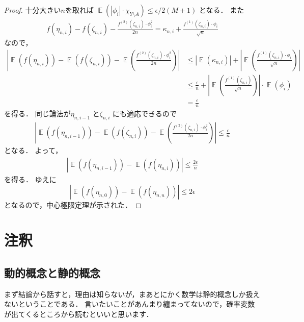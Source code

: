 \documentclass[leqno, 12pt]{jsarticle}
\DeclareMathOperator{\mean}{\mathbb{E}}
\begin{document}
\begin{proof}
十分大きい$n$を取れば
$\mean(|\phi_{i}|\cdot \chi_{Y\setminus A})\le\epsilon/2(M+1)$
となる．
また
\begin{align*}
f(\eta_{n, i})-f(\zeta_{n, i})-\frac{f^{(2)}(\zeta_{n, i})\cdot \phi_{i}^2}{2n}
=
\kappa_{n, i}+
\frac{f^{(1)}(\zeta_{n, i})\cdot \phi_{i}}{\sqrt{n}}
\end{align*}
なので，
\begin{align*}
\left|
\mean\left(
f(\eta_{n, i})\right)
-
\mean(f(\zeta_{n, i}))
-
\mean\left(\frac{f^{(2)}(\zeta_{n, i})\cdot \phi_{i}^2}{2n}
\right)
\right|
&\le 
|\mean(\kappa_{n, i})|
+
\left|
\mean\left(
\frac{f^{(1)}(\zeta_{n, i})\cdot \phi_{i}}{\sqrt{n}}
\right)
\right|
\\
&\le 
\frac{\epsilon}{n}
+
\left|\mean
\left(
\frac{f^{(1)}(\zeta_{n, i})}{\sqrt{n}}
\right)\right|\cdot \mean\left(\phi_{i}\right)\\
&=
\frac{\epsilon}{n}
\end{align*}
を得る．
同じ論法が$\eta_{n, i-1}$
と$\zeta_{n, i}$
にも適応できるので
\begin{align*}
\left|
\mean\left(
f(\eta_{n, i-1})\right)
-
\mean(f(\zeta_{n, i}))
-
\mean\left(\frac{f^{(2)}(\zeta_{n, i})\cdot \phi_{i}^2}{2n}
\right)
\right|
\le 
\frac{\epsilon}{n}
\end{align*}
となる．
よって，
\begin{align*}
\left|
\mean(
f(\eta_{n, i-1}))
-
\mean(f(\eta_{n, i}))
\right|
\le 
\frac{2\epsilon}{n}
\end{align*}
を得る．
ゆえに
\[
\left|
\mean(
f(\eta_{n, 0}))
-
\mean(f(\eta_{n, n}))
\right|
\le 2\epsilon
\]
となるので，中心極限定理が示された．
\end{proof}

\section{注釈}

\subsection{動的概念と静的概念}
まず結論から話すと，理由は知らないが，まあとにかく数学は静的概念しか扱えないということである．
言いたいことがあんまり纏まってないので，確率変数が出てくるところから読むといいと思います．
\end{document}
